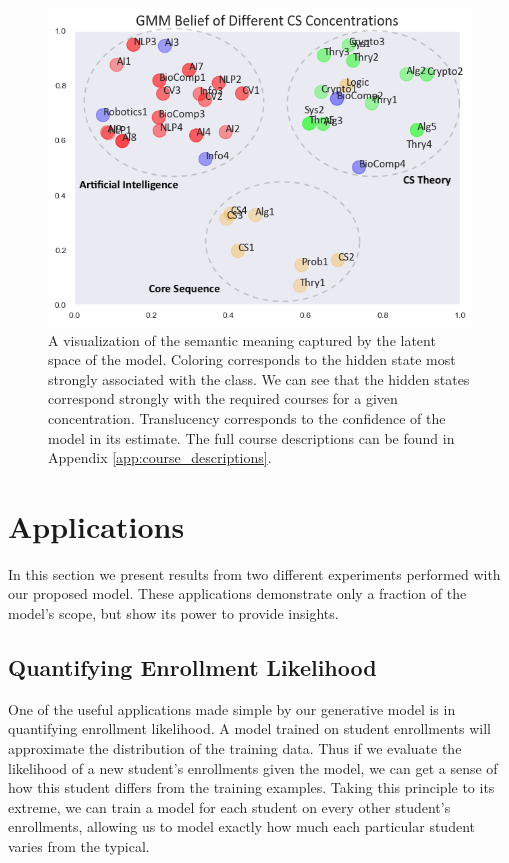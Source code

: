 \documentclass{edm_template}
\begin{document}
\begin{figure}[h]
    \centering
    \includegraphics[scale=0.5]{figures/gmm_clusters.png}
    \caption{A visualization of the semantic meaning captured by the latent space of the model. Coloring corresponds to the hidden state most strongly associated with the class. We can see that the hidden states correspond strongly with the required courses for a given concentration. Translucency corresponds to the confidence of the model in its estimate. The full course descriptions can be found in Appendix \ref{app:course_descriptions}.}
    \label{fig:gmm_clusters}
\end{figure}

\section{Applications}
\label{section:applications}

In this section we present results from two different experiments performed with our proposed model. These applications demonstrate only a fraction of the model's scope, but show its power to provide insights.

\subsection{Quantifying Enrollment Likelihood}

One of the useful applications made simple by our generative model is in quantifying enrollment likelihood. A model trained on student enrollments will approximate the distribution of the training data. Thus if we evaluate the likelihood of a new student's enrollments given the model, we can get a sense of how this student differs from the training examples. Taking this principle to its extreme, we can train a model for each student on every other student's enrollments, allowing us to model exactly how much each particular student varies from the typical. 
\end{document}
